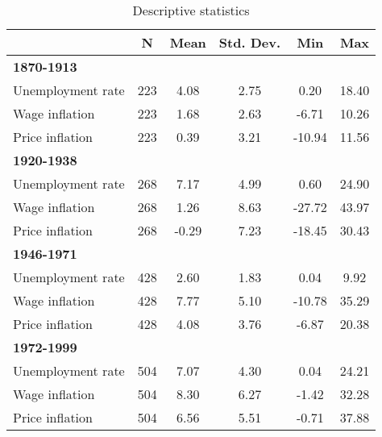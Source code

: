 \begin{table}[ht!]
\caption{Descriptive statistics}
\label{T_Descriptives}
\centering
\def\sym#1{\ifmmode^{#1}\else\(^{#1}\)\fi}
\begin{tabular}{l*{1}{ccccc}}
\hline\hline
                                         
                    &       \textbf{N}    &        \textbf{Mean}&   \textbf{Std. Dev.}&         \textbf{Min}&         \textbf{Max}\\
\hline
\textbf{1870-1913}          &            &            &            &            &            \\
Unemployment rate   &         223&        4.08&        2.75&        0.20&       18.40\\
Wage inflation      &         223&        1.68&        2.63&       -6.71&       10.26\\
Price inflation     &         223&        0.39&        3.21&      -10.94&       11.56\\
\hline
\textbf{1920-1938}           &            &            &            &            &            \\
Unemployment rate   &         268&        7.17&        4.99&        0.60&       24.90\\
Wage inflation      &         268&        1.26&        8.63&      -27.72&       43.97\\
Price inflation     &         268&       -0.29&        7.23&      -18.45&       30.43\\
\hline
\textbf{1946-1971}           &            &            &            &            &            \\
Unemployment rate   &         428&        2.60&        1.83&        0.04&        9.92\\
Wage inflation      &         428&        7.77&        5.10&      -10.78&       35.29\\
Price inflation     &         428&        4.08&        3.76&       -6.87&       20.38\\
\hline
\textbf{1972-1999}           &            &            &            &            &            \\
Unemployment rate   &         504&        7.07&        4.30&        0.04&       24.21\\
Wage inflation      &         504&        8.30&        6.27&       -1.42&       32.28\\
Price inflation     &         504&        6.56&        5.51&       -0.71&       37.88\\

\end{tabular}
\end{table}
